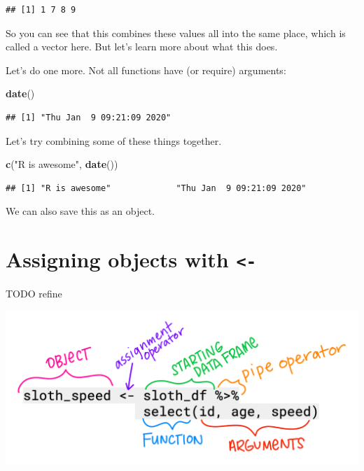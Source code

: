 \documentclass[]{book}
\newenvironment{Shaded}{\begin{snugshade}}{\end{snugshade}}
\newcommand{\KeywordTok}[1]{\textcolor[rgb]{0.13,0.29,0.53}{\textbf{#1}}}
\newcommand{\NormalTok}[1]{#1}
\newcommand{\StringTok}[1]{\textcolor[rgb]{0.31,0.60,0.02}{#1}}
\begin{document}
\begin{verbatim}
## [1] 1 7 8 9
\end{verbatim}

So you can see that this combines these values all into the same place, which is called a vector here. But let's learn more about what this does.

Let's do one more. Not all functions have (or require) arguments:

\begin{Shaded}
\begin{Highlighting}[]
\KeywordTok{date}\NormalTok{()}
\end{Highlighting}
\end{Shaded}

\begin{verbatim}
## [1] "Thu Jan  9 09:21:09 2020"
\end{verbatim}

Let's try combining some of these things together.

\begin{Shaded}
\begin{Highlighting}[]
\KeywordTok{c}\NormalTok{(}\StringTok{"R is awesome"}\NormalTok{, }\KeywordTok{date}\NormalTok{())}
\end{Highlighting}
\end{Shaded}

\begin{verbatim}
## [1] "R is awesome"             "Thu Jan  9 09:21:09 2020"
\end{verbatim}

We can also save this as an object.

\hypertarget{assigning-objects-with--}{%
\section{\texorpdfstring{Assigning objects with \texttt{\textless{}-}}{Assigning objects with \textless{}-}}\label{assigning-objects-with--}}

TODO refine

\includegraphics[width=0.6\linewidth]{img/horst-naming-terms}
\end{document}
